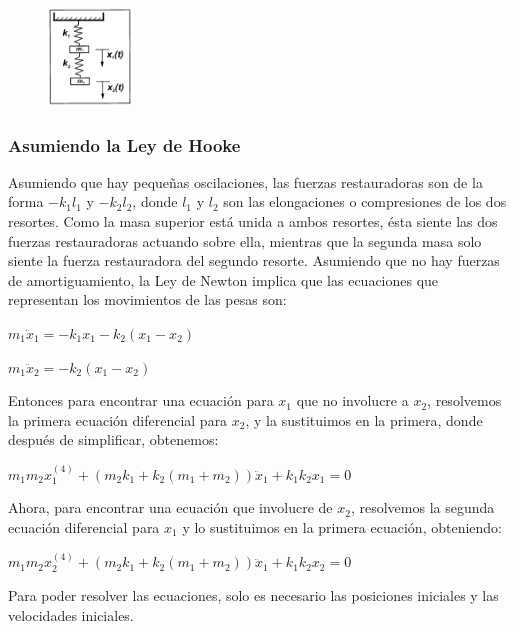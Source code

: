\documentclass[a4paper]{article}
\begin{document}
\begin{figure}[h]
 \centering
  \includegraphics[width=0.2\textwidth]{ModeloResorte.PNG}
\end{figure}

\subsubsection{Asumiendo la Ley de Hooke}
Asumiendo que hay pequeñas oscilaciones, las fuerzas restauradoras son de la forma $- k_1l_1$ y $- k_2l_2$, donde $l_1$ y $l_2$ son las elongaciones o compresiones de los dos resortes. Como la masa superior está unida a ambos resortes, ésta siente las dos fuerzas restauradoras actuando sobre ella, mientras que la segunda masa solo siente la fuerza restauradora del segundo resorte. Asumiendo que no hay fuerzas de amortiguamiento, la Ley de Newton implica que las ecuaciones que representan los movimientos de las pesas son:

\begin{center}
$m_1\ddot x_1 = - k_1x_1 - k_2(x_1 - x_2)$

$m_1\ddot x_2 = - k_2(x_1 - x_2)$
\end{center}

Entonces para encontrar una ecuación para $x_1$ que no involucre a $x_2$, resolvemos la primera ecuación diferencial para $x_2$, y la sustituimos en la primera, donde después de simplificar, obtenemos:

\begin{center}
$m_1m_2x_1^{(4)} + (m_2k_1 + k_2(m_1 + m_2))\ddot x_1 + k_1k_2x_1 = 0$
\end{center}

Ahora, para encontrar una ecuación que involucre de $x_2$, resolvemos la segunda ecuación diferencial para $x_1$ y lo sustituimos en la primera ecuación, obteniendo:

\begin{center}
$m_1m_2x_2^{(4)} + (m_2k_1 + k_2(m_1 + m_2))\ddot x_1 + k_1k_2x_2 = 0$
\end{center}

Para poder resolver las ecuaciones, solo es necesario las posiciones iniciales y las velocidades iniciales.
\end{document}
